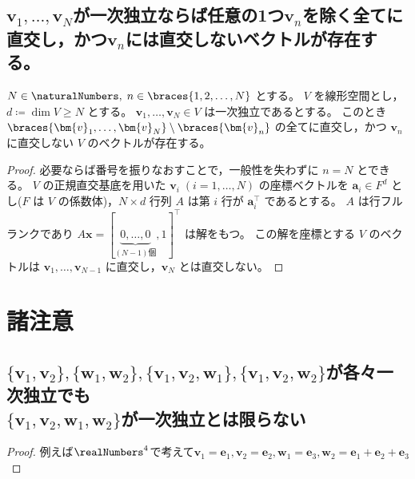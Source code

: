         \subsection{\texorpdfstring{$\bm{v}_1,\dots,\bm{v}_N$}{v1,...,vN}が一次独立ならば任意の1つ\texorpdfstring{$\bm{v}_n$}{vi}を除く全てに直交し，かつ\texorpdfstring{$\bm{v}_n$}{vi}には直交しないベクトルが存在する。}
            \begin{shadebox}
                $N\in\naturalNumbers,\;n\in\braces{1,2,\dots,N}$ とする。
                $V$ を線形空間とし，$d \coloneq \dim{V} \geq N$ とする。
                $\bm{v}_1,\dots,\bm{v}_N \in V$ は一次独立であるとする。
                このとき $\braces{\bm{v}_1,\dots,\bm{v}_N}\setminus\braces{\bm{v}_n}$ の全てに直交し，かつ $\bm{v}_n$ に直交しない $V$ のベクトルが存在する。
            \end{shadebox}
            \begin{proof}
                \quad\par
                必要ならば番号を振りなおすことで，一般性を失わずに $n=N$ とできる。
                $V$ の正規直交基底を用いた $\bm{v}_i\;(i=1,\dots,N)$ の座標ベクトルを $\bm{a}_i\in F^d$ とし($F$ は $V$ の係数体)，$N\times d$ 行列 $A$ は第 $i$ 行が $\bm{a}_i^\top$ であるとする。
                $A$ は行フルランクであり $A\bm{x} = [\underbrace{0,\dots,0}_{(N-1)\text{個}},1]^\top$ は解をもつ。
                この解を座標とする $V$ のベクトルは $\bm{v}_1,\dots,\bm{v}_{N-1}$ に直交し，$\bm{v}_N$ とは直交しない。
            \end{proof}
    \section{諸注意}
        \subsection{
            \texorpdfstring{$\{\bm{v}_1,\bm{v}_2\},\{\bm{w}_1,\bm{w}_2\},\{\bm{v}_1,\bm{v}_2,\bm{w}_1\},\{\bm{v}_1,\bm{v}_2,\bm{w}_2\}$}{\{v1,v2\},\{w1,w2\},\{v1,v2,w1\},\{v1,v2,w2\}}が各々一次独立でも\texorpdfstring{\\}{}
            \texorpdfstring{$\{\bm{v}_1,\bm{v}_2,\bm{w}_1,\bm{w}_2\}$}{\{v1,v2,w1,w2\}}が一次独立とは限らない}
            \begin{proof}
                例えば$\realNumbers^4$で考えて$\bm{v}_1=\bm{e}_1,\bm{v}_2=\bm{e}_2,\bm{w}_1=\bm{e}_3,\bm{w}_2=\bm{e}_1+\bm{e}_2+\bm{e}_3$
            \end{proof}
